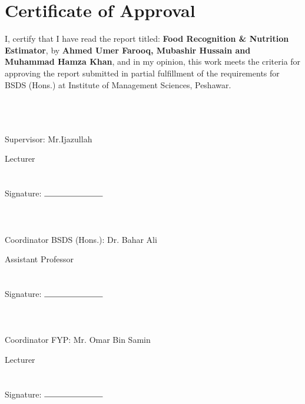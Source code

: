 \documentclass[12pt, openany]{report}
\begin{document}
\chapter*{\centering Certificate of Approval}
I, certify that I have read the report titled: \textbf {Food Recognition \& Nutrition Estimator}, by \textbf {Ahmed Umer Farooq, Mubashir Hussain and Muhammad Hamza Khan}, and in my opinion, this work meets the criteria for approving the report submitted in partial fulfillment of the requirements for BSDS (Hons.) at Institute of Management Sciences, Peshawar.
\\~\\~\\~\\
\begin{flushright}
Supervisor: Mr.Ijazullah

Lecturer
\\~\\~\\
Signature: $\rule{2.5cm}{0.15mm}$
\\~\\~\\~\\
Coordinator BSDS (Hons.): Dr. Bahar Ali

Assistant Professor
\\~\\~\\
Signature: $\rule{2.5cm}{0.15mm}$
\\~\\~\\~\\
Coordinator FYP: Mr. Omar Bin Samin

Lecturer
\\~\\~\\
Signature: $\rule{2.5cm}{0.15mm}$
\end{flushright}    


\end{document}
